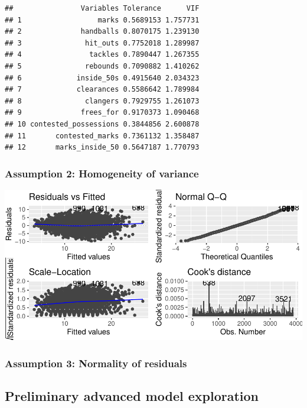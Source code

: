 \documentclass{article}
\begin{document}
\begin{verbatim}
##                Variables Tolerance      VIF
## 1                  marks 0.5689153 1.757731
## 2              handballs 0.8070175 1.239130
## 3               hit_outs 0.7752018 1.289987
## 4                tackles 0.7890447 1.267355
## 5               rebounds 0.7090882 1.410262
## 6             inside_50s 0.4915640 2.034323
## 7             clearances 0.5586642 1.789984
## 8               clangers 0.7929755 1.261073
## 9              frees_for 0.9170373 1.090468
## 10 contested_possessions 0.3844856 2.600878
## 11       contested_marks 0.7361132 1.358487
## 12       marks_inside_50 0.5647187 1.770793
\end{verbatim}

\hypertarget{assumption-2-homogeneity-of-variance}{%
\subsubsection{Assumption 2: Homogeneity of
variance}\label{assumption-2-homogeneity-of-variance}}

\includegraphics{OLET5608_TrentHenderson_files/figure-latex/unnamed-chunk-10-1.pdf}

\hypertarget{assumption-3-normality-of-residuals}{%
\subsubsection{Assumption 3: Normality of
residuals}\label{assumption-3-normality-of-residuals}}

\hypertarget{preliminary-advanced-model-exploration}{%
\subsection{Preliminary advanced model
exploration}\label{preliminary-advanced-model-exploration}}
\end{document}

